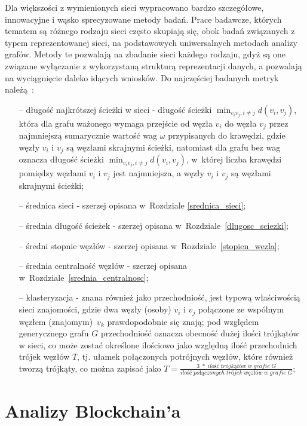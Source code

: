 \documentclass[12pt, oneside, final, openany]{mgr}
\begin{document}
\indent Dla większości z wymienionych sieci wypracowano bardzo szczegółowe, innowacyjne i wąsko sprecyzowane metody badań. Prace badawcze, których tematem są różnego rodzaju sieci często skupiają się, obok badań związanych z typem reprezentowanej sieci, na podstawowych uniwersalnych metodach analizy grafów. Metody te pozwalają na zbadanie sieci każdego rodzaju, gdyż są one związane wyłączanie z wykorzystaną strukturą reprezentacji danych, a pozwalają na wyciągnięcie daleko idących wniosków. Do najczęściej badanych metryk należą~\cite{barabasi2016network, wasserman1994social, Watts1998}:
\begin{itemize}
\item[--] długość najkrótszej ścieżki w sieci - długość ścieżki $\min_{v_iv_j, i \ne j} d(v_i, v_j)$, która dla grafu ważonego wymaga przejście od węzła $v_i$ do węzła $v_j$ przez najmniejszą sumarycznie wartość wag $\omega$ przypisanych do krawędzi, gdzie węzły $v_i$ i $v_j$ są węzłami skrajnymi ścieżki, natomiast dla grafu bez wag oznacza długość ścieżki $\min_{v_iv_j, i \ne j} d(v_i, v_j)$, w~której liczba krawędzi pomiędzy węzłami $v_i$ i $v_j$ jest najmniejsza, a węzły $v_i$ i $v_j$ są węzłami skrajnymi ścieżki;
\item[--] średnica sieci - szerzej opisana w~Rozdziale \ref{srednica_sieci};
\item[--] średnia długość ścieżek - szerzej opisana w~Rozdziale~\ref{dlugosc_sciezki};
\item[--] średni stopnie węzłów - szerzej opisana w~Rozdziale~\ref{stopien_wezla};
\item[--] średnia centralność węzłów - szerzej opisana w~Rozdziale~\ref{srednia_centralnosc};
\item[--] klasteryzacja - znana również jako przechodniość, jest typową właściwością sieci znajomości, gdzie dwa węzły (osoby) $v_i$ i $v_j$ połączone ze wspólnym węzłem (znajomym)~$v_k$ prawdopodobnie się znają; pod względem generycznego grafu $G$ przechodniość oznacza obecność dużej ilości trójkątów w sieci, co może zostać określone ilościowo jako względną ilość przechodnich trójek węzłów $T$, tj. ułamek połączonych potrójnych węzłów, które również tworzą trójkąty, co można zapisać jako $T = \frac{3\; *\; ilość \; trójkątów \; w \; grafie \; G}{ilość \; połączonych \; trójek \; węzłów \; w \; grafie \; G}$;
\end{itemize}

\if@archive\else\newpage\fi
\section{Analizy Blockchain'a}
\end{document}
